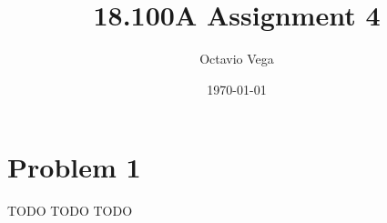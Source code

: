 \documentclass{article}
\title{18.100A Assignment 4}
\author{Octavio Vega}
\date\today
\begin{document}
\maketitle

\section*{Problem 1}
TODO TODO TODO
	
\end{document}
